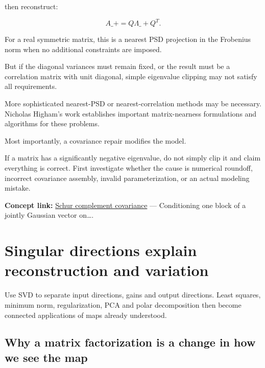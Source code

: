 then reconstruct:

\[
 \boxed{ A\_+=Q\Lambda\_+Q^T }.
\]

For a real symmetric matrix, this is a nearest PSD projection in the Frobenius norm when no additional constraints are imposed.

But if the diagonal variances must remain fixed, or the result must be a correlation matrix with unit diagonal, simple eigenvalue clipping may not satisfy all requirements.

More sophisticated nearest-PSD or nearest-correlation methods may be necessary. Nicholas Higham's work establishes important matrix-nearness formulations and algorithms for these problems.

Most importantly, a covariance repair modifies the model.

If a matrix has a significantly negative eigenvalue, do not simply clip it and claim everything is correct. First investigate whether the cause is numerical roundoff, incorrect covariance assembly, invalid parameterization, or an actual modeling mistake.

\textbf{Concept link:} \hyperref[02-foundations-ii-ch024-waiting-times-event-counts-and-covariance-geometry]{Schur complement covariance} --- Conditioning one block of a jointly Gaussian vector on\ldots.

\section{Singular directions explain reconstruction and variation}\label{02-foundations-ii-ch024-singular-directions-explain-reconstruction-and-variation}

\hypertarget{02-foundations-ii-ch024-singular-directions-explain-reconstruction-and-variation}{}

Use SVD to separate input directions, gains and output directions. Least squares, minimum norm, regularization, PCA and polar decomposition then become connected applications of maps already understood.

\subsection{Why a matrix factorization is a change in how we see the map}\label{02-foundations-ii-ch024-why-a-matrix-factorization-is-a-change-in-how-we-see-the-map}

\hypertarget{02-foundations-ii-ch024-why-a-matrix-factorization-is-a-change-in-how-we-see-the-map}{}

